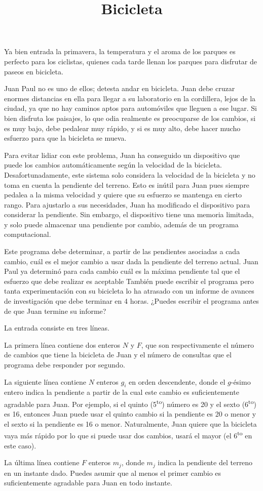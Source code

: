 \documentclass{oci}
\title{Bicicleta}
\begin{document}
\begin{problemDescription}
Ya bien entrada la primavera, la temperatura y el aroma de los parques es 
perfecto para los ciclistas, quienes cada tarde llenan los parques para
disfrutar de paseos en bicicleta.

Juan Paul no es uno de ellos; detesta andar en bicicleta.
Juan debe cruzar enormes distancias en ella para llegar a su laboratorio en la
cordillera, lejos de la ciudad, ya que no hay caminos aptos para automóviles
que lleguen a ese lugar.
Si bien disfruta los paisajes, lo que odia realmente es preocuparse de los
cambios, si es muy bajo, debe pedalear muy rápido, y si es muy alto, debe hacer
mucho esfuerzo para que la bicicleta se mueva.

Para evitar lidiar con este problema, Juan ha conseguido un dispositivo que
puede los cambios automáticamente según la velocidad de la bicicleta.
Desafortunadamente, este sistema solo considera la velocidad de la bicicleta y
no toma en cuenta la pendiente del terreno.
Esto es inútil para Juan pues siempre pedalea a la misma velocidad y quiere que
su esfuerzo se mantenga en cierto rango.
Para ajustarlo a sus necesidades, Juan ha modificado el dispositivo para
considerar la pendiente.
Sin embargo, el dispositivo tiene una memoria limitada, y solo puede almacenar
una pendiente por cambio, además de un programa computacional.

Este programa debe determinar, a partir de las pendientes asociadas a cada
cambio, cuál es el mejor cambio a usar dada la pendiente del terreno actual.
Juan Paul ya determinó para cada cambio cuál es la máxima pendiente tal que el
esfuerzo que debe realizar es aceptable
También puede escribir el programa pero tanta experimentación con su bicicleta
lo ha atrasado con un informe de avances de investigación que debe terminar en
4 horas.
¿Puedes escribir el programa antes de que Juan termine su informe?
\end{problemDescription}

\begin{inputDescription}
La entrada consiste en tres líneas.

La primera línea contiene dos enteros $N$ y $F$, que son respectivamente el
número de cambios que tiene la bicicleta de Juan y el número de consultas que
el programa debe responder por segundo.

La siguiente línea contiene $N$ enteros $g_i$ en orden descendente, donde el
$g$-ésimo entero indica la pendiente a partir de la cual este cambio es
suficientemente agradable para Juan.
Por ejemplo, si el quinto (5\textsuperscript{to}) número es 20 y el sexto
(6\textsuperscript{to}) es 16, entonces Juan puede usar el quinto cambio si la
pendiente es 20 o menor y el sexto si la pendiente es 16 o menor.
Naturalmente, Juan quiere que la bicicleta vaya más rápido por lo que si puede
usar dos cambios, usará el mayor (el 6\textsuperscript{to} en este caso).

La última línea contiene $F$ enteros $m_j$, donde $m_j$ indica la pendiente del
terreno en un instante dado.
Puedes asumir que al menos el primer cambio es suficientemente agradable para
Juan en todo instante.
\end{inputDescription}
\end{document}
